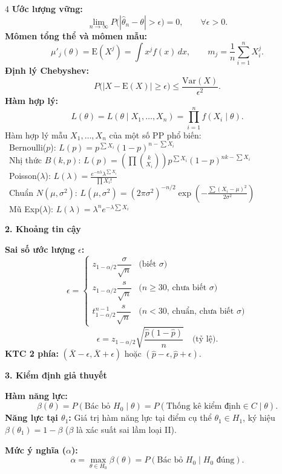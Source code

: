 \documentclass[a4paper,landscape]{article}
\newcommand{\sect}[1]{%
  \vspace{0.7pt}\noindent
  \colorbox{black!10}{\parbox{\dimexpr\linewidth-2\fboxsep\relax}{\bfseries #1}}%
  \vspace{0.2pt}\par}
\begin{document}
\begin{multicols*}{4}
\textbf{Ước lượng vững:}
\[
 \lim_{n\to\infty}P\bigl(|\hat\theta_n-\theta|>\epsilon\bigr)=0,
 \qquad \forall\epsilon>0.
\]
\textbf{Mômen tổng thể và mômen mẫu:}
\[
 \mu'_j(\theta)=\mathrm E(X^j)=\int x^j f(x)\,dx,
 \qquad m_j=\frac1n\sum_{i=1}^{n}X_i^j.
\]
\textbf{Định lý Chebyshev:}
\[
 P\bigl(|X-\mathrm E(X)|\geq\epsilon\bigr)
 \leq\frac{\mathrm{Var}(X)}{\epsilon^2}.
\]
\textbf{Hàm hợp lý:}
\[
 L(\theta) = L(\theta \mid X_1, \ldots, X_n) = \prod_{i=1}^{n}f(X_i\mid\theta).
\]
Hàm hợp lý mẫu $X_1,\dots,X_n$ của một số PP phổ biến: \\[2.5pt]
\textbullet\ Bernoulli($p$): $\displaystyle L(p) = p^{\sum X_i}(1-p)^{n-\sum X_i}$ \\[2.5pt]
\textbullet\ Nhị thức $B(k,p)$: $\displaystyle L(p) = \left(\prod\binom{k}{X_i}\right) p^{\sum X_i}(1-p)^{nk-\sum X_i}$ \\[2.5pt]
\textbullet\ Poisson($\lambda$): $\displaystyle L(\lambda) = \frac{e^{-n\lambda}\lambda^{\sum X_i}}{\prod X_i!}$ \\[2.5pt]
\textbullet\ Chuẩn $N(\mu,\sigma^2)$: $\displaystyle L(\mu,\sigma^2) = (2\pi\sigma^2)^{-n/2}\exp\left(-\frac{\sum(X_i-\mu)^2}{2\sigma^2}\right)$ \\[2.5pt]
\textbullet\ Mũ Exp($\lambda$): $\displaystyle L(\lambda) = \lambda^n e^{-\lambda\sum X_i}$

\sect{2. Khoảng tin cậy}
\textbf{Sai số ước lượng $\epsilon$:}
\[
 \epsilon=
 \begin{cases}
 z_{1-\alpha/2}\dfrac{\sigma}{\sqrt n} & \text{(biết $\sigma$)}\\[1.5pt]
 z_{1-\alpha/2}\dfrac{s}{\sqrt n} & \text{($n\geq30$, chưa biết $\sigma$)}\\[1.5pt]
 t^{n-1}_{1-\alpha/2}\dfrac{s}{\sqrt n} & \text{($n<30$, chuẩn, chưa biết $\sigma$)}
 \end{cases}
\]
\[
 \epsilon=z_{1-\alpha/2}\sqrt{\frac{\hat p(1-\hat p)}{n}} \quad\text{(tỷ lệ)}.
\]
\textbf{KTC 2 phía:} $(\overline X-\epsilon, \overline X+\epsilon)$ hoặc $(\hat p-\epsilon, \hat p+\epsilon)$.

\sect{3. Kiểm định giả thuyết}
\textbf{Hàm năng lực:}
\[
 \beta(\theta)=P(\text{Bác bỏ }H_0\mid\theta)
 =P(\text{Thống kê kiểm định}\in C\mid\theta).
\]
\textbf{Năng lực tại $\theta_1$:} Giá trị hàm năng lực tại điểm cụ thể
$\theta_1\in H_1$, ký hiệu $\beta(\theta_1)=1-\beta$
($\beta$ là xác suất sai lầm loại II).

\textbf{Mức ý nghĩa ($\alpha$):}
\[
 \alpha=\max_{\theta\in H_0}\beta(\theta)
 =P(\text{Bác bỏ }H_0\mid H_0\text{ đúng}).
\]


\end{multicols*}
\end{document}
